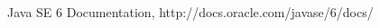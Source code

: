 %




\begin{thebibliography}{9}

	Java SE 6 Documentation, http://docs.oracle.com/javase/6/docs/

\end{thebibliography}


